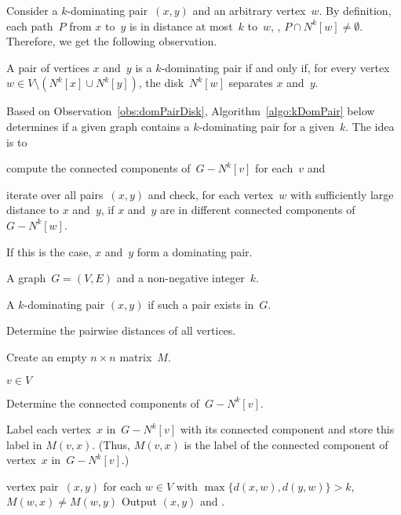 Consider a $k$-dominating pair~$(x, y)$ and an arbitrary vertex~$w$.
By definition, each path~$P$ from $x$ to~$y$ is in distance at most~$k$ to~$w$, \ie, $P \cap N^k[w] \neq \emptyset$.
Therefore, we get the following observation.

\begin{observation}
    \label{obs:domPairDisk}
A pair of vertices $x$ and~$y$ is a $k$-dominating pair if and only if, for every vertex $w \in V \setminus \left( N^k[x] \cup N^k[y] \right)$, the disk~$N^k[w]$ separates $x$ and~$y$.
\end{observation}

Based on Observation~\ref{obs:domPairDisk}, Algorithm~\ref{algo:kDomPair} below determines if a given graph contains a $k$-dominating pair for a given~$k$.
The idea is to
\begin{enumerate*}[(i),mode=unboxed]
\item
    compute the connected components of~$G - N^k[v]$ for each~$v$ and
\item
    iterate over all pairs~$(x, y)$ and check, for each vertex~$w$ with sufficiently large distance to $x$ and~$y$, if $x$ and~$y$ are in different connected components of~$G - N^k[w]$.
\end{enumerate*}
If this is the case, $x$ and~$y$ form a dominating pair.

\begin{algorithm}
    \caption
    {%
        Determines if a given graph contains a $k$-dominating pair.
    }
    \label{algo:kDomPair}
%

\KwIn
{%
    A graph~$G = (V, E)$ and a non-negative integer~$k$.
}

\KwOut
{%
    A $k$-dominating pair $(x, y)$ if such a pair exists in~$G$.
}

Determine the pairwise distances of all vertices.

Create an empty $n \times n$ matrix~$M$.

\ForEach
{%
    $v \in V$
}
{%
    Determine the connected components of~$G - N^k[v]$.

    Label each vertex~$x$ in~$G - N^k[v]$ with its connected component and store this label in $M(v, x)$.
    (Thus, $M(v, x)$ is the label of the connected component of vertex~$x$ in~$G - N^k[v]$.)
}

\ForEach
{%
    vertex pair~$(x, y)$
}
{%
    \If
    {%
        for each $w \in V$ with $\max \big \{ d(x, w), d(y, w) \big \} > k$, $M(w, x) \neq M(w, y)$%
        \label{line:kDOmPairCheckAllW}
    }
    {%
        Output $(x, y)$ and .
    }
}
\end{algorithm}

